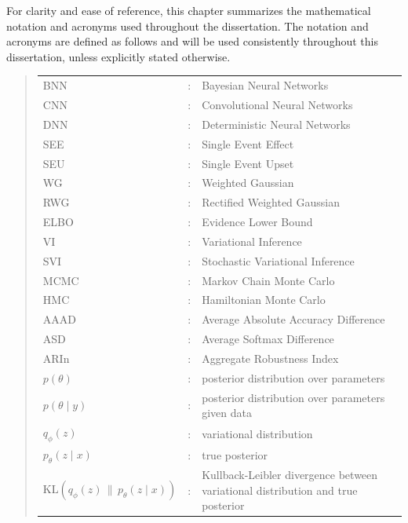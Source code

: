 \documentclass[ %
                    author={Revalda Putawara},
                supervisor={Dr. James Pope},
                    degree={MSc},
                     title={Robustness of Bayesian Neural Networks Design Choices Against Weight and Bias Perturbation Induced by Single Event Upsets (SEUs)},
                      type={},
                      year={2025}]{dissertation}
\begin{document}
For clarity and ease of reference, this chapter summarizes the mathematical notation and acronyms used throughout the dissertation. The notation and acronyms are defined as follows and will be used consistently throughout this dissertation, unless explicitly stated otherwise.

\begin{quote}
\noindent
\begin{tabular}{lcl}
BNN                 &:     & Bayesian Neural Networks                                         \\
CNN                 &:     & Convolutional Neural Networks                                         \\
DNN                 &:     & Deterministic Neural Networks                                          \\
SEE                 &:     & Single Event Effect                                         \\
SEU                 &:     & Single Event Upset                                         \\
WG                 &:     & Weighted Gaussian                                         \\
RWG                 &:     & Rectified Weighted Gaussian                                         \\
ELBO                 &:     & Evidence Lower Bound                                    \\
VI                 &:     & Variational Inference                                        \\
SVI                 &:     & Stochastic Variational Inference                                        \\
MCMC                 &:     & Markov Chain Monte Carlo                                        \\
HMC                 &:     & Hamiltonian Monte Carlo                                      \\
AAAD                &:      & Average Absolute Accuracy Difference \\
ASD                 &:      & Average Softmax Difference \\
ARIn                &:      & Aggregate Robustness Index \\
$p(\theta)$         &:     & posterior distribution over parameters \\   
$p(\theta \mid y)$        &:     & posterior distribution over parameters given data\\
$q_\phi(z)$         &:      & variational distribution \\
$p_\theta(z \mid x)$&:      & true posterior \\
$\mathrm{KL}\!\left(q_\phi(z)\,\|\,p_\theta(z \mid x)\right)$&:     & Kullback-Leibler divergence between variational distribution and true posterior\\   

\end{tabular}
\end{quote}
\end{document}
